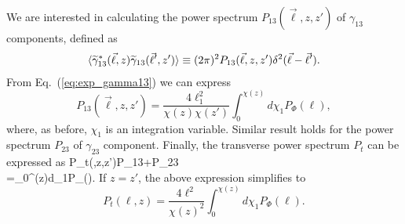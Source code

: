 We are interested in calculating the power spectrum $P_{13}(\vec{\ell},z,z')$ of $\gamma_{13}$ components, defined as
\begin{equation}
\begin{gathered}
\langle\widetilde{\gamma}_{13}^*(\vec{\ell},z)\widetilde{\gamma}_{13}(\vec{\ell}',z')\rangle\equiv(2\pi)^2P_{13}(\vec{\ell},z,z')\delta^2(\vec{\ell}-\vec{\ell}').
\end{gathered}
\end{equation}
From Eq.~(\ref{eq:exp_gamma13}) we can express
\begin{equation}
P_{13}(\vec{\ell},z,z')=\frac{4\ell_1^2}{\chi(z)\chi(z')}\int_0^{\chi(z)}d\chi_1P_{\Phi}(\ell),
\end{equation}
where, as before, $\chi_1$ is an integration variable.
Similar result holds for the power spectrum $P_{23}$ of $\gamma_{23}$ component. Finally, the transverse power spectrum $P_t$ can be expressed as 
\beq
\bga
P_t(\ell,z,z')\equiv P_{13}+P_{23}\\
=\int_0^{\chi(z)}d\chi_1P_{\Phi}(\ell).
\ega
\eeq
If $z=z'$, the above expression simplifies to
\begin{equation}
P_t(\ell,z)=\frac{4\ell^2}{\chi(z)^2}\int_0^{\chi(z)}d\chi_1P_{\Phi}(\ell).
\end{equation}

